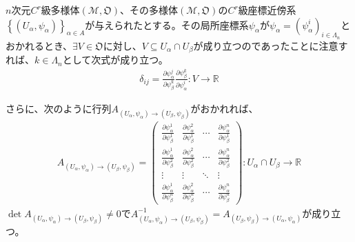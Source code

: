 \documentclass[dvipdfmx]{jsarticle}
\begin{document}
\begin{thm}\label{8.3.2.4}
$n$次元$C^{r}$級多様体$\left( \mathcal{M},\mathfrak{O} \right)$、その多様体$\left( \mathcal{M},\mathfrak{O} \right)$の$C^{r}$級座標近傍系$\left\{ \left( U_{\alpha},\psi_{\alpha} \right) \right\}_{\alpha \in A}$が与えられたとする。その局所座標系$\psi_\alpha $が$\psi_\alpha =\left( \psi_\alpha^i \right)_{i\in \varLambda_n }$とおかれるとき、$\exists V\in \mathfrak{O}$に対し、$V\subseteq U_\alpha \cap U_\beta $が成り立つのであったことに注意すれば、$k\in \varLambda_n $として次式が成り立つ。
\begin{align*}
  \delta_{ij} = \frac{\partial \psi_\alpha^j }{\partial \psi_\beta^k } \frac{\partial \psi_\beta^k }{\partial \psi_\alpha^i } : V\rightarrow \mathbb{R}
\end{align*}\par
さらに、次のように行列$A_{\left(U_\alpha ,\psi_\alpha \right)\rightarrow \left(U_\beta ,\psi_\beta \right)}$がおかれれば、
\begin{align*}
  A_{\left(U_\alpha ,\psi_\alpha \right)\rightarrow \left(U_\beta ,\psi_\beta \right)} = \begin{pmatrix}
    \frac{\partial \psi_\alpha^1 }{\partial \psi_\beta^1 } & \frac{\partial \psi_\alpha^2 }{\partial \psi_\beta^1 } & \cdots & \frac{\partial \psi_\alpha^n }{\partial \psi_\beta^1 } \\
    \frac{\partial \psi_\alpha^1 }{\partial \psi_\beta^2 } & \frac{\partial \psi_\alpha^2 }{\partial \psi_\beta^2 } & \cdots & \frac{\partial \psi_\alpha^n }{\partial \psi_\beta^2 } \\
    \vdots & \vdots & \ddots & \vdots \\
    \frac{\partial \psi_\alpha^1 }{\partial \psi_\beta^n } & \frac{\partial \psi_\alpha^2 }{\partial \psi_\beta^n } & \cdots & \frac{\partial \psi_\alpha^n }{\partial \psi_\beta^n } 
  \end{pmatrix} : U_\alpha \cap U_\beta \rightarrow \mathbb{R}
\end{align*}
$\det A_{\left(U_\alpha ,\psi_\alpha \right)\rightarrow \left(U_\beta ,\psi_\beta \right)} \ne 0$で$A_{\left(U_\alpha ,\psi_\alpha \right)\rightarrow \left(U_\beta ,\psi_\beta \right)}^{-1} = A_{\left(U_\beta ,\psi_\beta \right)\rightarrow \left(U_\alpha ,\psi_\alpha \right)} $が成り立つ。
\end{thm}
\end{document}
